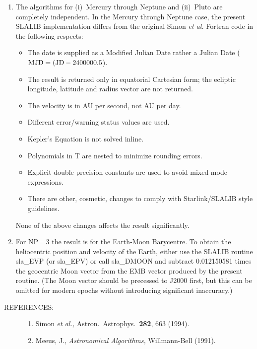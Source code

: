 \documentclass[11pt,twoside,nolof]{starlink}
\providecommand{\arcsec}[2] {\arcseci{#1}$\hspace{-0.4em}.#2$}
\providecommand{\arcseci}[1] {$#1\hspace{-0.05em}$\raisebox{-0.5ex}
                         {$^{'\hspace{-0.1em}'}$}}
\renewcommand{\refs}[1]
 {  \begin{description}
     \item[REFERENCES:]
         #1
   \end{description}
}
\begin{document}
{\begin{enumerate}
        In the case of Pluto, Meeus quotes an accuracy of \arcsec{0}{6}
        in longitude and \arcsec{0}{2} in latitude for the period
        1885-2099.

        For all except Pluto, over the period 1000-3000,
        the accuracy is better than 1.5
        times that over 1800-2200.  Outside the interval 1000-3000 the
        accuracy declines.  For Pluto the accuracy declines rapidly
        outside the period 1885-2099.  Outside these ranges
        (1885-2099 for Pluto, 1000-3000 for the rest) a ``date out
        of range'' warning status (\texttt{JSTAT=+1}) is returned.
  \item The algorithms for (i)~Mercury through Neptune and
        (ii)~Pluto are completely independent.  In the Mercury
        through Neptune case, the present SLALIB
        implementation differs from the original
        Simon \textit{et al.}\/ Fortran code in the following respects:
        \begin{itemize}
         \item The date is supplied as a Modified Julian Date rather
               a Julian Date (${\rm MJD} = ({\rm JD} - 2400000.5$).
         \item The result is returned only in equatorial
               Cartesian form;  the ecliptic
               longitude, latitude and radius vector are not returned.
         \item The velocity is in AU per second, not AU per day.
         \item Different error/warning status values are used.
         \item Kepler's Equation is not solved inline.
         \item Polynomials in T are nested to minimize rounding errors.
         \item Explicit double-precision constants are used to avoid
               mixed-mode expressions.
         \item There are other, cosmetic, changes to comply with
               Starlink/SLALIB style guidelines.
        \end{itemize}
        None of the above changes affects the result significantly.
  \item For NP\,=\,3 the result is for the Earth-Moon Barycentre.  To
        obtain the heliocentric position and velocity of the Earth,
        either use the SLALIB routine sla\_EVP (or sla\_EPV)
        or call sla\_DMOON and
        subtract 0.012150581 times the geocentric Moon vector from
        the EMB vector produced by the present routine.  (The Moon
        vector should be precessed to J2000 first, but this can
        be omitted for modern epochs without introducing significant
        inaccuracy.)
 \end{enumerate}
\refs
{
 \begin{enumerate}
  \item Simon \textit{et al.,}\/
        Astron.\ Astrophys.\ \textbf{282}, 663 (1994).
  \item Meeus, J.,
        \textit{Astronomical Algorithms,}\/ Willmann-Bell (1991).
 \end{enumerate}
}
}
\end{document}
